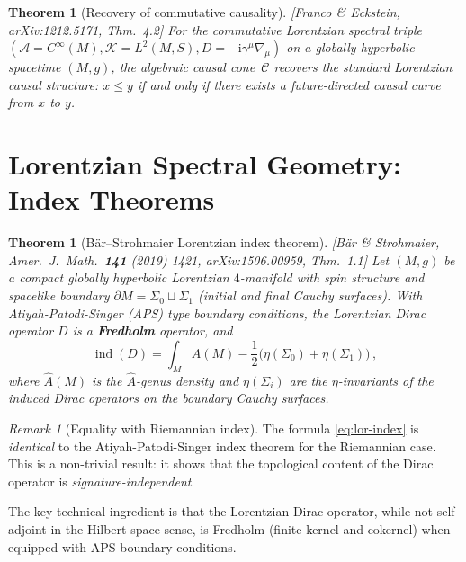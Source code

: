 \documentclass[12pt,a4paper]{article}
\newtheorem{theorem}[proposition]{Theorem}
\theoremstyle{definition}
\theoremstyle{remark}
\newtheorem{remark}[proposition]{Remark}
\newcommand{\ii}{\mathrm{i}}
\DeclareMathOperator{\ind}{ind}
\newcommand{\fromlit}[1]{\textcolor{blue!70!black}{\textsf{[#1]}}}
\begin{document}
\begin{theorem}[Recovery of commutative causality]
\label{thm:franco-eckstein}
\fromlit{Franco \& Eckstein, arXiv:1212.5171, Thm.~4.2}
For the commutative Lorentzian spectral triple
$(\mathcal{A} = C^\infty(M), \mathcal{K} = L^2(M,S),
D = -\ii\gamma^\mu\nabla_\mu)$ on a globally hyperbolic spacetime
$(M,g)$, the algebraic causal cone~$\mathcal{C}$ recovers the
standard Lorentzian causal structure: $x \leq y$ if and only if
there exists a future-directed causal curve from $x$ to $y$.
\end{theorem}


\section{Lorentzian Spectral Geometry: Index Theorems}
\label{sec:index}

\begin{theorem}[B\"{a}r--Strohmaier Lorentzian index theorem]
\label{thm:bar-strohmaier}
\fromlit{B\"{a}r \& Strohmaier, Amer.\ J.\ Math.\ \textbf{141}
(2019) 1421, arXiv:1506.00959, Thm.~1.1}
Let $(M, g)$ be a compact globally hyperbolic Lorentzian $4$-manifold
with spin structure and spacelike boundary
$\partial M = \Sigma_0 \sqcup \Sigma_1$ (initial and final Cauchy
surfaces).  With Atiyah-Patodi-Singer (APS) type boundary conditions,
the Lorentzian Dirac operator $D$ is a \textbf{Fredholm} operator, and
\begin{equation}\label{eq:lor-index}
  \ind(D) = \int_M \hat{A}(M) -
  \frac{1}{2}\bigl(\eta(\Sigma_0) + \eta(\Sigma_1)\bigr)\,,
\end{equation}
where $\hat{A}(M)$ is the $\hat{A}$-genus density and
$\eta(\Sigma_i)$ are the $\eta$-invariants of the induced Dirac
operators on the boundary Cauchy surfaces.
\end{theorem}

\begin{remark}[Equality with Riemannian index]
The formula \eqref{eq:lor-index} is \emph{identical} to the
Atiyah-Patodi-Singer index theorem for the Riemannian case.  This is a
non-trivial result: it shows that the topological content of the Dirac
operator is \emph{signature-independent}.

The key technical ingredient is that the Lorentzian Dirac operator,
while not self-adjoint in the Hilbert-space sense, is Fredholm (finite
kernel and cokernel) when equipped with APS boundary conditions.
\end{remark}
\end{document}
